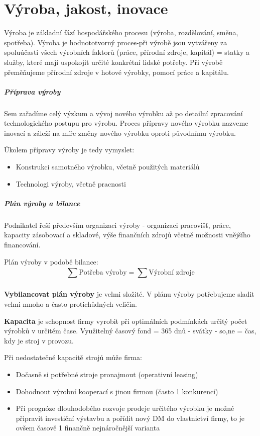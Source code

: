 \chapter{Výroba, jakost, inovace}

Výroba je základní fází hospodářského procesu (výroba, rozdělování, směna, spotřeba). Výroba je hodnototvorný proces-při výrobě jsou vytvářeny za spoluúčasti všech výrobních faktorů (práce, přírodní zdroje, kapitál) = statky a služby, které mají uspokojit určité konkrétní lidské potřeby. Při výrobě přeměňujeme přírodní zdroje v hotové výrobky, pomocí práce a kapitálu.

\paragraph*{Příprava výroby}
Sem zařadíme celý výzkum a vývoj nového výrobku až po detailní zpracování technologického postupu pro výrobu. Proces přípravy nového výrobku nazveme inovací a záleží na míře změny nového výrobku oproti původnímu výrobku.

Úkolem přípravy výroby je tedy vymyslet:
\begin{itemize}
    \item Konstrukci samotného výrobku, včetně použitých materiálů
    \item Technologi výroby, včetně pracnosti
\end{itemize}

\paragraph*{Plán výroby a bilance}
Podnikatel řeší především organizaci výroby - organizaci pracovišť, práce, kapacity zásobovací a skladové, výše finančních zdrojů včetně možnosti vnějšího financování.

Plán výroby v podobě bilance:
\begin{displaymath}
    \sum_{}^{} \text{Potřeba výroby} = \sum_{}^{} \text{Výrobní zdroje}
\end{displaymath}

\textbf{Vybilancovat plán výroby} je velmi složité. V plánu výroby potřebujeme sladit velmi mnoho a často protichůdných veličin.

\textbf{Kapacita} je schopnost firmy vyrobit při optimálních podmínkách určitý počet výrobků v určitém čase. Využitelný časový fond = 365 dnů - svátky - so,ne = čas, kdy je stroj v provozu.

Při nedostatečné kapacitě strojů může firma:
\begin{itemize}
    \item Dočasně si potřebné stroje pronajmout (operativní leasing)
    \item Dohodnout výrobní kooperací s jinou firmou (často 1 konkurencí)
    \item Při prognóze dlouhodobého rozvoje prodeje určitého výrobku je možné připravit investiční výstavbu a pořídit nový DM do vlastnictví firmy, to je ovšem časově 1 finančně nejnáročnější varianta
\end{itemize}

